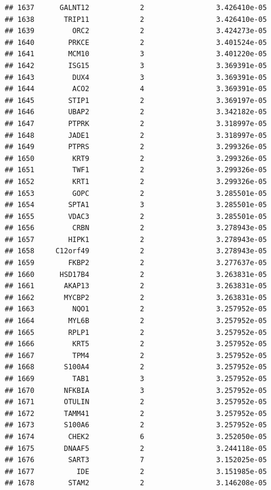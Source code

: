\documentclass[
]{article}
\begin{document}
\begin{verbatim}
## 1637      GALNT12            2                 3.426410e-05
## 1638       TRIP11            2                 3.426410e-05
## 1639         ORC2            2                 3.424273e-05
## 1640        PRKCE            2                 3.401524e-05
## 1641        MCM10            3                 3.401220e-05
## 1642        ISG15            3                 3.369391e-05
## 1643         DUX4            3                 3.369391e-05
## 1644         ACO2            4                 3.369391e-05
## 1645        STIP1            2                 3.369197e-05
## 1646        UBAP2            2                 3.342182e-05
## 1647        PTPRK            2                 3.318997e-05
## 1648        JADE1            2                 3.318997e-05
## 1649        PTPRS            2                 3.299326e-05
## 1650         KRT9            2                 3.299326e-05
## 1651         TWF1            2                 3.299326e-05
## 1652         KRT1            2                 3.299326e-05
## 1653         GOPC            2                 3.285501e-05
## 1654        SPTA1            3                 3.285501e-05
## 1655        VDAC3            2                 3.285501e-05
## 1656         CRBN            2                 3.278943e-05
## 1657        HIPK1            2                 3.278943e-05
## 1658     C12orf49            2                 3.278943e-05
## 1659        FKBP2            2                 3.277637e-05
## 1660      HSD17B4            2                 3.263831e-05
## 1661       AKAP13            2                 3.263831e-05
## 1662       MYCBP2            2                 3.263831e-05
## 1663         NQO1            2                 3.257952e-05
## 1664        MYL6B            2                 3.257952e-05
## 1665        RPLP1            2                 3.257952e-05
## 1666         KRT5            2                 3.257952e-05
## 1667         TPM4            2                 3.257952e-05
## 1668       S100A4            2                 3.257952e-05
## 1669         TAB1            3                 3.257952e-05
## 1670       NFKBIA            3                 3.257952e-05
## 1671       OTULIN            2                 3.257952e-05
## 1672       TAMM41            2                 3.257952e-05
## 1673       S100A6            2                 3.257952e-05
## 1674        CHEK2            6                 3.252050e-05
## 1675       DNAAF5            2                 3.244118e-05
## 1676        SART3            7                 3.152025e-05
## 1677          IDE            2                 3.151985e-05
## 1678        STAM2            2                 3.146208e-05

\end{verbatim}
\end{document}
